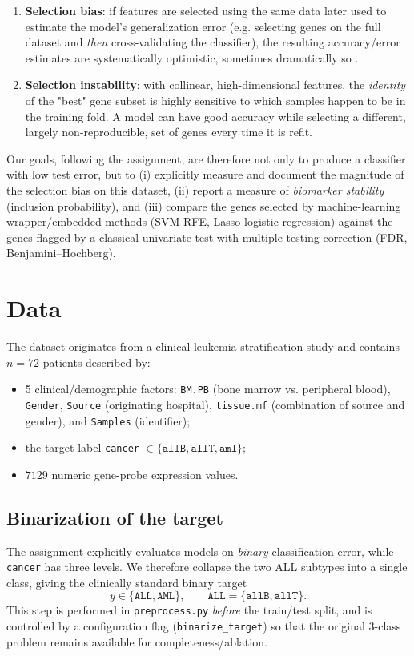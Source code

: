\documentclass[11pt,a4paper]{article}
\begin{document}
\begin{enumerate}
    \item \textbf{Selection bias}: if features are selected using the same data later used to estimate the model's generalization error (e.g. selecting genes on the full dataset and \emph{then} cross-validating the classifier), the resulting accuracy/error estimates are systematically optimistic, sometimes dramatically so \cite{ambroise2002selection}.
    \item \textbf{Selection instability}: with collinear, high-dimensional features, the \emph{identity} of the "best" gene subset is highly sensitive to which samples happen to be in the training fold. A model can have good accuracy while selecting a different, largely non-reproducible, set of genes every time it is refit.
\end{enumerate}

Our goals, following the assignment, are therefore not only to produce a classifier with low test error, but to (i) explicitly measure and document the magnitude of the selection bias on this dataset, (ii) report a measure of \emph{biomarker stability} (inclusion probability), and (iii) compare the genes selected by machine-learning wrapper/embedded methods (SVM-RFE, Lasso-logistic-regression) against the genes flagged by a classical univariate test with multiple-testing correction (FDR, Benjamini--Hochberg).

\section{Data}
The dataset originates from a clinical leukemia stratification study and contains $n=72$ patients described by:
\begin{itemize}
    \item 5 clinical/demographic factors: \texttt{BM.PB} (bone marrow vs. peripheral blood), \texttt{Gender}, \texttt{Source} (originating hospital), \texttt{tissue.mf} (combination of source and gender), and \texttt{Samples} (identifier);
    \item the target label \texttt{cancer} $\in \{\texttt{allB}, \texttt{allT}, \texttt{aml}\}$;
    \item $7129$ numeric gene-probe expression values.
\end{itemize}

\subsection{Binarization of the target}
The assignment explicitly evaluates models on \emph{binary} classification error, while \texttt{cancer} has three levels.
We therefore collapse the two ALL subtypes into a single class, giving the clinically standard binary target
\[
y \in \{\texttt{ALL}, \texttt{AML}\}, \qquad
\texttt{ALL} = \{\texttt{allB}, \texttt{allT}\}.
\]
This step is performed in \texttt{preprocess.py} \emph{before} the train/test split, and is controlled by a configuration flag (\texttt{binarize\_target}) so that the original 3-class problem remains available for completeness/ablation.
\end{document}
